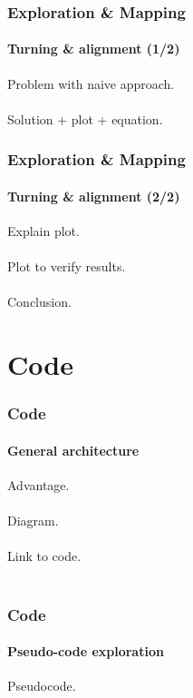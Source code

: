\documentclass{beamer}
\begin{document}

\begin{frame}
\frametitle{Exploration \& Mapping}
\framesubtitle{Turning \& alignment (1/2)}
Problem with naive approach.\\~\\
Solution + plot + equation.
\end{frame}


\begin{frame}
\frametitle{Exploration \& Mapping}
\framesubtitle{Turning \& alignment (2/2)}
Explain plot.\\~\\
Plot to verify results.\\~\\
Conclusion.
\end{frame}

\section{Code} 

\begin{frame}
\frametitle{Code}
\framesubtitle{General architecture}
Advantage.\\~\\
Diagram.\\~\\
Link to code.\\~\\
\end{frame}


\begin{frame}
\frametitle{Code}
\framesubtitle{Pseudo-code exploration}
Pseudocode.\\~\\
\end{frame}


\end{document}
